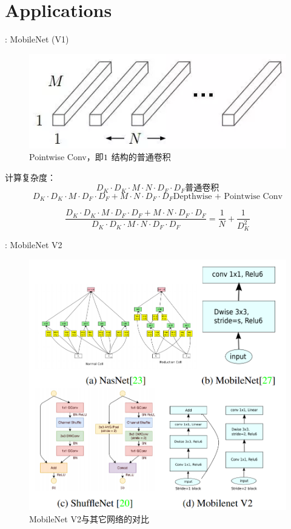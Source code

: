 \section{Applications}

\begin{frame}{\titleprefix: MobileNet (V1)}
	\begin{figure}
		\centering
		\includegraphics[width=0.5\linewidth]{Images/pointwise_1}
		\caption{Pointwise Conv，即$1\time 1$ 结构的普通卷积}
		\label{fig:pointwise1}
	\end{figure}

计算复杂度：
	\[
D_{K} \cdot D_{K} \cdot M \cdot N \cdot D_{F} \cdot D_{F}
\text{普通卷积}
\]	
\[
D_{K} \cdot D_{K} \cdot M \cdot D_{F} \cdot D_{F}+M \cdot N \cdot D_{F} \cdot D_{F}
\text{Depthwise + Pointwise Conv}
\]

\[
 \frac{D_{K} \cdot D_{K} \cdot M \cdot D_{F} \cdot D_{F}+M \cdot N \cdot D_{F} \cdot D_{F}}{D_{K} \cdot D_{K} \cdot M \cdot N \cdot D_{F} \cdot D_{F}} = \frac{1}{N}+\frac{1}{D_{K}^{2}} 
\]
\end{frame}

\begin{frame}{\titleprefix: MobileNet V2}
	\begin{figure}
		\centering
		\includegraphics[width=0.6\linewidth]{Images/mobilenetv2}
		\caption{MobileNet V2与其它网络的对比}
		\label{fig:mobilenetv2}
	\end{figure}
	
\end{frame}


